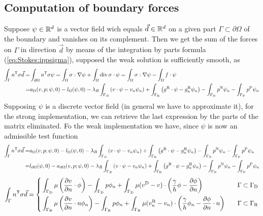 \subsection{Computation of boundary forces}\label{subsec:}
%
Suppose $\psi\in\mathbb R^d$ is a vector field wich equals $\vec{d}\in\mathbb R^d$ on a given part $\Gamma\subset\partial\Omega$ of the boundary and vanishes on its complement. Then we get the sum of the forces on $\Gamma$ in direction $\vec{d}$ by means of the integration by parts formula (\ref{eq:Stokes:ippsigma}), supposed the weak solution is sufficiently smooth, as
%
\begin{align*}
\int_{\Gamma} {n}^{\mathsf{T}}\sigma \vec{d} =& \int_{\partial\Omega} {n}^{\mathsf{T}}\sigma \psi
=\int_{\Omega} \sigma:\nabla\psi  + \int_{\Omega} \operatorname{div} \sigma\cdot \psi
=\int_{\Omega} \sigma:\nabla\psi  -\int_{\Omega} f\cdot \psi\\
=& a_{\Omega}(v,p; \psi,0) - l_{\Omega}(\psi,0) - \lambda_R\int_{\Gamma_R}\left(v\cdot\psi - v_n\psi_n\right)+ \int_{\Gamma_{\rm R}}\left(g^{\rm R}\cdot\psi - g^{\rm R}_n\psi_n\right)
 -\int_{\Gamma_{\rm N}}p^{\rm N} \psi_n -\int_{\Gamma_{\rm P}}p^{\rm P} \psi_n
\end{align*}
%
Supposing $\psi$ is a discrete vector field (in general we have to approximate it), for the strong implementation, we can retrieve the last expression by the parts of the matrix eliminated.
Fo the weak implementation we have, since $\psi$ is now an admissible test function
%
\begin{align*}
\int_{\Gamma} {n}^{\mathsf{T}}\sigma \vec{d} =&a_{\Omega}(v,p; \psi,0) - l_{\Omega}(\psi,0) - \lambda_R\int_{\Gamma_R}\left(v\cdot\psi - v_n\psi_n\right)+ \int_{\Gamma_{\rm R}}\left(g^{\rm R}\cdot\psi - g^{\rm R}_n\psi_n\right)
 -\int_{\Gamma_{\rm N}}p^{\rm N} \psi_n-\int_{\Gamma_{\rm P}}p^{\rm P} \psi_n\\
=&  l_{\partial\Omega}(\psi,0) - a_{\partial\Omega}(v,p; \psi,0) - \lambda_R\int_{\Gamma_R}\left(v\cdot\psi - v_n\psi_n\right)+ \int_{\Gamma_{\rm R}}\left(g^{\rm R}\cdot\psi - g^{\rm R}_n\psi_n\right)
 -\int_{\Gamma_{\rm N}}p^{\rm N} \psi_n-\int_{\Gamma_{\rm P}}p^{\rm P} \psi_n
\end{align*}
%
%
\begin{equation}\label{eq:}
%
\int_{\Gamma} \transpose{n}\sigma \vec{d} =
\left\{
\begin{aligned}
& 
 \int_{\GammaD}\mu \left(  \dn{v}\cdot  \phi \right)
- \int_{\GammaD}  p\phi_n 
+\int_{\GammaD}\mu(\vD-v)\cdot\left( \frac{\gamma}{h}\phi - \dn{\phi}\right)
&\quad \Gamma\subset\GammaD\\ 
& 
 \int_{\GammaR} \mu\left( \dn{v}\cdot n \phi_n \right)
- \int_{\GammaR} p\phi_n  
+\int_{\GammaR}\mu(\vRn-v_n)\cdot\left( \frac{\gamma}{h}\phi_n - \dn{\phi}\cdot n\right)
&\quad \Gamma\subset\GammaR
\end{aligned}
\right.
%
\end{equation}
% 
%
